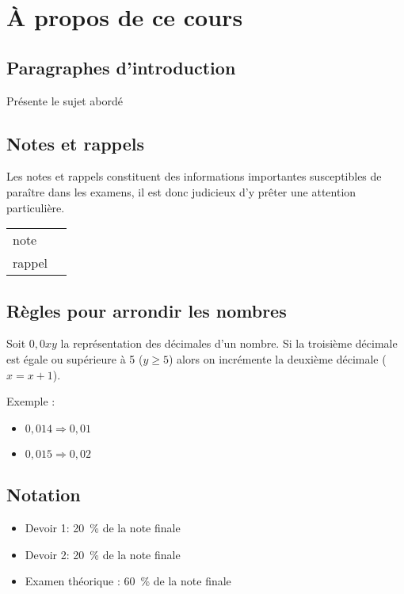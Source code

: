 \chapter*{À propos de ce cours}



\section*{Paragraphes d'introduction}
\begin{intro}
	Présente le sujet abordé 
\end{intro}



\section*{Notes et rappels}
\begin{note}
	Les notes et rappels constituent des informations importantes susceptibles de paraître dans les examens, il est donc judicieux d'y prêter une attention particulière.
	\begin{center}
		\begin{tabular}{l@{\qquad}l}
			note   & \Large\righthand \\
			rappel & \Large\aldine
		\end{tabular}
	\end{center}
\end{note}



\section*{Règles pour arrondir les nombres}
Soit $0,0xy$ la représentation des décimales d'un nombre. Si la troisième décimale est égale ou supérieure à 5 ($y \geq 5$) alors on incrémente la deuxième décimale ($x = x + 1$).

Exemple :
\begin{itemize}
	\item $0,014 \Rightarrow 0,01$
	\item $0,015 \Rightarrow 0,02$
\end{itemize}



\section*{Notation}
\begin{itemize}
	\item Devoir 1: 20~\% de la note finale
	\item Devoir 2: 20~\% de la note finale
	\item Examen théorique : 60~\% de la note finale
\end{itemize}

